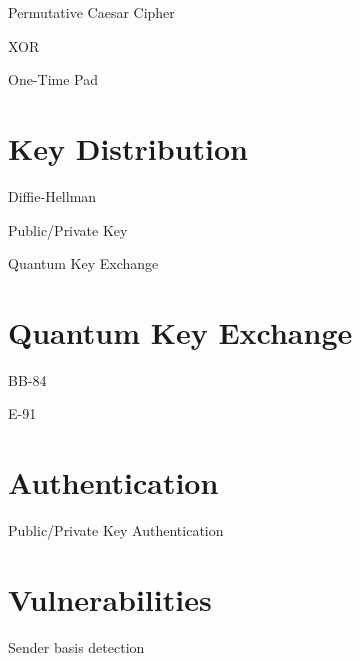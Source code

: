 \documentclass{beamer}
\begin{document}
	\begin{frame}{Permutative Caesar Cipher} %

	\end{frame}

	\begin{frame}{XOR} %

	\end{frame}

	\begin{frame}{One-Time Pad} %

	\end{frame}

	\section{Key Distribution}

	\begin{frame}{Diffie-Hellman} %

	\end{frame}

	\begin{frame}{Public/Private Key} %

	\end{frame}

	\begin{frame}{Quantum Key Exchange} %

	\end{frame}

	\section{Quantum Key Exchange}

	\begin{frame}{BB-84} %

	\end{frame}

	\begin{frame}{E-91} %

	\end{frame}

	\section{Authentication}

	\begin{frame}{Public/Private Key Authentication} %

	\end{frame}

	\section{Vulnerabilities}

	\begin{frame}{Sender basis detection} %

	\end{frame}


	\begin{frame}[plain]\end{frame}
\end{document}
